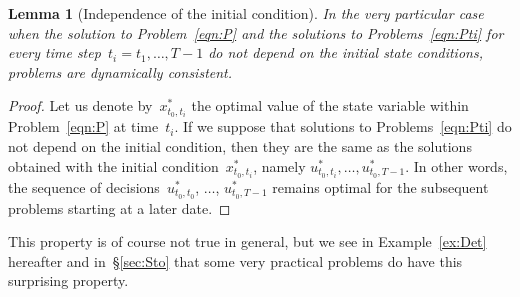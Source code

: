 \documentclass[a4paper]{amsart}
\theoremstyle{plain}
\newtheorem{lemma}{Lemma}
\theoremstyle{definition}
\theoremstyle{remark}
\begin{document}
\begin{lemma}[Independence of the initial condition] \label{ppty:Indpdt}
In the very particular case when the solution to
Problem~\eqref{eqn:P} and the solutions to
Problems~\eqref{eqn:Pti} for every time step~$t_i=t_1, \dots, T-1$
do not depend on the initial state conditions, problems are
dynamically consistent.
\end{lemma}

\begin{proof}
Let us denote by~$x_{t_0, t_i}^*$ the optimal value of the state
variable within Problem~\eqref{eqn:P} at time~$t_i$. If we suppose
that solutions to Problems~\eqref{eqn:Pti} do not depend on the
initial condition, then they are the same as  the solutions
obtained with the initial condition~$x_{t_0, t_i}^*$, namely
$u_{t_0,t_i}^*, \dots, u_{t_0,T-1}^*$. In other words, the
sequence of decisions~$u_{t_0,t_0}^*$, $\dots$, $u_{t_0,T-1}^*$
remains optimal for the subsequent problems starting at a later
date.
\end{proof}

This property is of course not true in general, but we see in
Example~\ref{ex:Det} hereafter and in~\S\ref{sec:Sto} that some
very practical problems do have this surprising property.
\end{document}
